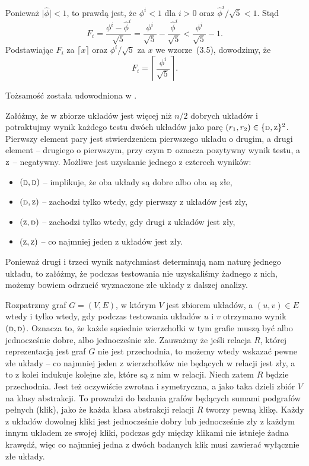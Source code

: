 \subproblem %
Ponieważ $\bigl|\widehat\phi\bigr|<1$, to prawdą jest, że $\phi^i<1$ dla $i>0$ oraz $\widehat\phi^i/\sqrt{5}<1$. Stąd
\[
	F_i = \frac{\phi^i-\widehat\phi^i}{\sqrt{5}} = \frac{\phi^i}{\sqrt{5}}-\frac{\widehat\phi^i}{\sqrt{5}} < \frac{\phi^i}{\sqrt{5}}-1.
\]
Podstawiając $F_i$ za $\lceil x\rceil$ oraz $\phi^i/\sqrt{5}$ za $x$ we wzorze~(3.5), dowodzimy, że
\[
	F_i = \left\lceil\frac{\phi^i}{\sqrt{5}}\right\rceil.
\]

\subproblem %
Tożsamość została udowodniona w .


\subproblem %
Załóżmy, że w zbiorze układów jest więcej niż $n/2$ dobrych układów i potraktujmy wynik każdego testu dwóch układów jako parę $(r_1,r_2)\in\{{\scriptstyle\rm D},{\scriptstyle\rm Z}\}^2$. Pierwszy element pary jest stwierdzeniem pierwszego układu o drugim, a drugi element -- drugiego o pierwszym, przy czym ${\scriptstyle\rm D}$ oznacza pozytywny wynik testu, a~${\scriptstyle\rm Z}$ -- negatywny. Możliwe jest uzyskanie jednego z czterech wyników:
\begin{itemize}
	\item $({\scriptstyle\rm D},{\scriptstyle\rm D})$ -- implikuje, że oba układy są dobre albo oba są złe,
	\item $({\scriptstyle\rm D},{\scriptstyle\rm Z})$ -- zachodzi tylko wtedy, gdy pierwszy z układów jest zły,
	\item $({\scriptstyle\rm Z},{\scriptstyle\rm D})$ -- zachodzi tylko wtedy, gdy drugi z układów jest zły,
	\item $({\scriptstyle\rm Z},{\scriptstyle\rm Z})$ -- co najmniej jeden z układów jest zły.
\end{itemize}
Ponieważ drugi i trzeci wynik natychmiast determinują nam naturę jednego układu, to załóżmy, że podczas testowania nie uzyskaliśmy żadnego z nich, możemy bowiem odrzucić wyznaczone złe układy z dalszej analizy.

Rozpatrzmy graf $G=(V,E)$, w którym $V$ jest zbiorem układów, a $(u,v)\in E$ wtedy i tylko wtedy, gdy podczas testowania układów $u$ i $v$ otrzymano wynik $({\scriptstyle\rm D},{\scriptstyle\rm D})$. Oznacza to, że każde sąsiednie wierzchołki w tym grafie muszą być albo jednocześnie dobre, albo jednocześnie złe. Zauważmy że jeśli relacja $R$, której reprezentacją jest graf $G$ nie jest przechodnia, to możemy wtedy wskazać pewne złe układy -- co najmniej jeden z wierzchołków nie będących w relacji jest zły, a to z kolei indukuje kolejne złe, które są z nim w relacji. Niech zatem $R$ będzie przechodnia. Jest też oczywiście zwrotna i symetryczna, a jako taka dzieli zbiór $V$ na klasy abstrakcji. To prowadzi do badania grafów będących sumami podgrafów pełnych (klik), jako że każda klasa abstrakcji relacji $R$ tworzy pewną klikę. Każdy z układów dowolnej kliki jest jednocześnie dobry lub jednocześnie zły z każdym innym układem ze swojej kliki, podczas gdy między klikami nie istnieje żadna krawędź, więc co najmniej jedna z dwóch badanych klik musi zawierać wyłącznie złe układy.

